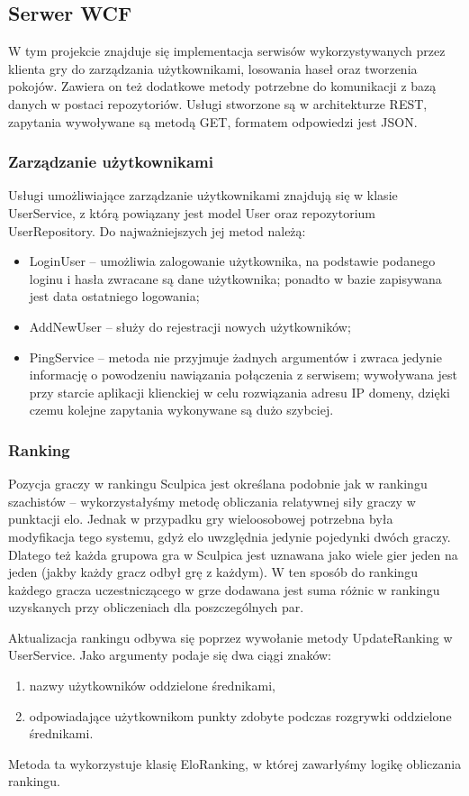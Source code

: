 \subsection{Serwer WCF}
W tym projekcie znajduje się implementacja serwisów wykorzystywanych przez klienta gry do zarządzania użytkownikami, losowania haseł oraz tworzenia pokojów. Zawiera on też dodatkowe metody potrzebne do komunikacji z bazą danych w postaci repozytoriów. Usługi stworzone są w architekturze REST, zapytania wywoływane są metodą GET, formatem odpowiedzi jest JSON.

\subsubsection{Zarządzanie użytkownikami}
Usługi umożliwiające zarządzanie użytkownikami znajdują się w klasie UserService, z którą powiązany jest model User oraz repozytorium UserRepository. Do najważniejszych jej metod należą:
\begin{itemize}
\item LoginUser – umożliwia zalogowanie użytkownika, na podstawie podanego loginu i hasła zwracane są dane użytkownika; ponadto w bazie zapisywana jest data ostatniego logowania;
\item AddNewUser – służy do rejestracji nowych użytkowników;
\item PingService – metoda nie przyjmuje żadnych argumentów i zwraca jedynie informację o powodzeniu nawiązania połączenia z serwisem; wywoływana jest przy starcie aplikacji klienckiej w celu rozwiązania adresu IP domeny, dzięki czemu kolejne zapytania wykonywane są dużo szybciej.
\end{itemize}

\subsubsection{Ranking}
Pozycja graczy w rankingu Sculpica jest określana podobnie jak w rankingu szachistów – wykorzystałyśmy metodę obliczania relatywnej siły graczy w punktacji elo. Jednak w przypadku gry wieloosobowej potrzebna była modyfikacja tego systemu, gdyż elo uwzględnia jedynie pojedynki dwóch graczy. Dlatego też każda grupowa gra w Sculpica jest uznawana jako wiele gier jeden na jeden (jakby każdy gracz odbył grę z każdym). W ten sposób do rankingu każdego gracza uczestniczącego w grze dodawana jest suma różnic w rankingu uzyskanych przy obliczeniach dla poszczególnych par.

Aktualizacja rankingu odbywa się poprzez wywołanie metody UpdateRanking w UserService. Jako argumenty podaje się dwa ciągi znaków:
\begin{enumerate}
    \item nazwy użytkowników oddzielone średnikami,
    \item odpowiadające użytkownikom punkty zdobyte podczas rozgrywki oddzielone średnikami.
\end{enumerate}
Metoda ta wykorzystuje klasię EloRanking, w której zawarłyśmy logikę obliczania rankingu.

